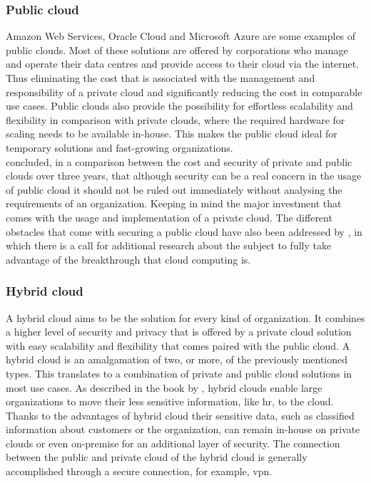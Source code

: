 \subsubsection{Public cloud}
Amazon Web Services, Oracle Cloud and Microsoft Azure are some examples of public clouds. 
Most of these solutions are offered by corporations who manage and operate their data centres and provide access to their cloud via the internet. 
Thus eliminating the cost that is associated with the management and responsibility of a private cloud and significantly reducing the cost in comparable use cases. 
Public clouds also provide the possibility for effortless scalability and flexibility in comparison with private clouds, where the required hardware for scaling needs to be available in-house. 
This makes the public cloud ideal for temporary solutions and fast-growing organizations.
\\
\textcite{Singh2012} concluded, in a comparison between the cost and security of private and public clouds over three years, that although security can be a real concern in the usage of public cloud it should not be ruled out immediately without analysing the requirements of an organization. 
Keeping in mind the major investment that comes with the usage and implementation of a private cloud.  
The different obstacles that come with securing a public cloud have also been addressed by \textcite{Ren2012}, in which there is a call for additional research about the subject to fully take advantage of the breakthrough that cloud computing is. 

\subsubsection{Hybrid cloud}
A hybrid cloud aims to be the solution for every kind of organization. 
It combines a higher level of security and privacy that is offered by a private cloud solution with easy scalability and flexibility that comes paired with the public cloud. 
A hybrid cloud is an amalgamation of two, or more, of the previously mentioned types. 
This translates to a combination of private and public cloud solutions in most use cases. 
As described in the book by \textcite{Sarna2010}, hybrid clouds enable large organizations to move their less sensitive information, like \acrfull{hr}, to the cloud. 
Thanks to the advantages of hybrid cloud their sensitive data, such as classified information about customers or the organization, can remain in-house on private clouds or even on-premise for an additional layer of security. 
The connection between the public and private cloud of the hybrid cloud is generally accomplished through a secure connection, for example, \acrfull{vpn}.

